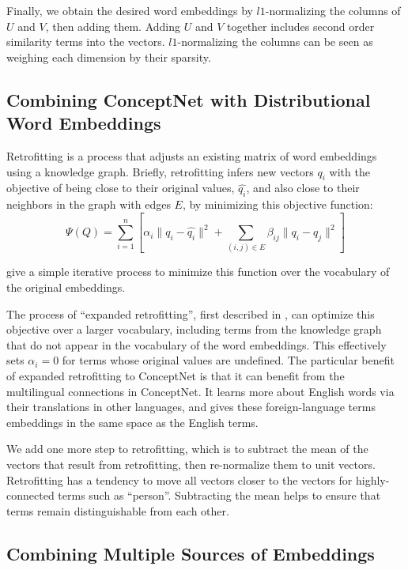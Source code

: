 \documentclass[letterpaper]{article}
\begin{document}
Finally, we obtain the desired word embeddings by $l1$-normalizing the columns
of $U$ and $V$, then adding them. Adding $U$ and $V$ together includes second
order similarity terms into the vectors. $l1$-normalizing the columns can be
seen as weighing each dimension by their sparsity.

\subsection{Combining ConceptNet with Distributional Word Embeddings}

Retrofitting \cite{faruqui2015retrofitting} is a process that adjusts an
existing matrix of word embeddings using a knowledge graph. Briefly, retrofitting
infers new vectors $q_i$ with the objective of being close to their original
values, $\hat{q_i}$, and also close to their neighbors in the graph with edges $E$,
by minimizing this objective function:
$$\Psi(Q) = \sum_{i=1}^{n}\left[
    \alpha_i \lVert q_i - \hat{q_i} \rVert ^2 + \sum_{(i, j) \in E} \beta_{ij} \lVert q_i - q_j \rVert ^2
\right] $$

\citeauthor{faruqui2015retrofitting} give a simple iterative process to minimize
this function over the vocabulary of the original embeddings.

The process of ``expanded retrofitting'', first described in
\cite{speer2016ensemble}, can optimize this objective over a larger vocabulary,
including terms from the knowledge graph that do not appear in the vocabulary
of the word embeddings. This effectively sets $\alpha_i = 0$ for terms whose
original values are undefined. The particular benefit of expanded retrofitting
to ConceptNet is that it can benefit from the multilingual connections in
ConceptNet. It learns more about English words via their translations in other
languages, and gives these foreign-language terms embeddings in the same space
as the English terms.

We add one more step to retrofitting, which is to subtract the mean of the
vectors that result from retrofitting, then re-normalize them to unit vectors.
Retrofitting has a tendency to move all vectors closer to the vectors for
highly-connected terms such as ``person''. Subtracting the mean helps to ensure
that terms remain distinguishable from each other.

\subsection{Combining Multiple Sources of Embeddings}
\end{document}
